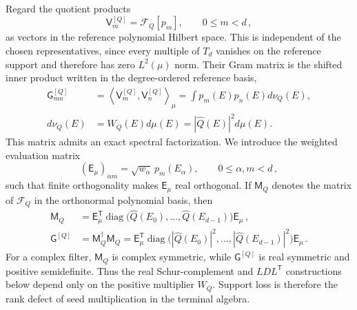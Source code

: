 \documentclass[a4paper,11pt]{article}
\def\dd{d}%
\theoremstyle{definition}
\theoremstyle{remark}
\newcommand{\dd}{\mathrm d}
\newcommand{\cF}{\mathcal F}
\newcommand{\diag}{\operatorname{diag}}
\newcommand{\Qhat}{\widehat Q}
\begin{document}
Regard the quotient products
\begin{equation}
   \mathsf V_m^{[Q]}=\cF_Q[p_m],
   \qquad 0\le m<d\,,
   \label{eq:finite-product-vectors-app}
\end{equation}
as vectors in the reference polynomial Hilbert space.  This is
independent of the chosen representatives, since every multiple of
$T_d$ vanishes on the reference support and therefore has zero
$L^2(\mu)$ norm.  Their Gram matrix is the shifted inner product written
in the degree-ordered reference basis, 
\begin{equation}
\begin{aligned}
   \mathsf G_{mn}^{[Q]}
   &=\left\langle
      \mathsf V_m^{[Q]},\mathsf V_n^{[Q]}
      \right\rangle_\mu
   =\int p_m(E)p_n(E)\dd\nu_Q(E),\\
   \dd\nu_Q(E)&=W_Q(E)\dd\mu(E)
   =|\Qhat(E)|^2\dd\mu(E).
\end{aligned}
   \label{eq:finite-product-Gram-app}
\end{equation}
This matrix admits an exact spectral factorization.  We introduce the
weighted evaluation matrix
\begin{equation}
   (\mathsf E_\mu)_{\alpha m}
   =\sqrt{w_\alpha}\,p_m(E_\alpha),
   \qquad 0\le\alpha,m<d\,,
\end{equation}
such that finite orthogonality makes $\mathsf E_\mu$ real orthogonal.  If
$\mathsf M_Q$ denotes the matrix of $\cF_Q$ in the orthonormal
polynomial basis, then 
\begin{equation}
\begin{aligned}
   \mathsf M_Q
   &=\mathsf E_\mu^{\mathsf T}
   \diag\!\bigl(
      \Qhat(E_0),\ldots,\Qhat(E_{d-1})
   \bigr)\mathsf E_\mu\,,\\
   \mathsf G^{[Q]}
   &=\mathsf M_Q^\dagger\mathsf M_Q
   =\mathsf E_\mu^{\mathsf T}
   \diag\!\bigl(
      |\Qhat(E_0)|^2,\ldots,|\Qhat(E_{d-1})|^2
   \bigr)\mathsf E_\mu\,.
\end{aligned}
   \label{eq:finite-product-spectral-factorization-app}
\end{equation}
For a complex filter, $\mathsf M_Q$ is complex symmetric, while
$\mathsf G^{[Q]}$ is real symmetric and positive semidefinite.  Thus the
real Schur-complement and $LDL^{\mathsf T}$ constructions below depend
only on the positive multiplier $W_Q$.
Support loss is therefore the rank defect of seed multiplication in the
terminal algebra.
\end{document}
